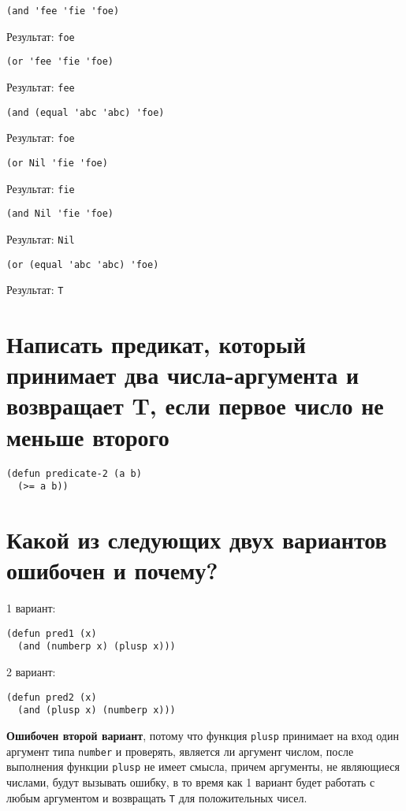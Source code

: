 \begin{lstlisting}
(and 'fee 'fie 'foe)
\end{lstlisting}
Результат: \texttt{foe}

\begin{lstlisting}
(or 'fee 'fie 'foe)
\end{lstlisting}
Результат: \texttt{fee}

\begin{lstlisting}
(and (equal 'abc 'abc) 'foe)
\end{lstlisting}
Результат: \texttt{foe}

\begin{lstlisting}
(or Nil 'fie 'foe)
\end{lstlisting}
Результат: \texttt{fie}

\begin{lstlisting}
(and Nil 'fie 'foe)
\end{lstlisting}
Результат: \texttt{Nil}

\begin{lstlisting}
(or (equal 'abc 'abc) 'foe)
\end{lstlisting}
Результат: \texttt{T}

\section{Написать предикат, который принимает два числа-аргумента и возвращает T, если первое число не меньше второго}

\begin{lstlisting}
(defun predicate-2 (a b)
  (>= a b))
\end{lstlisting}

\section{Какой из следующих двух вариантов ошибочен и почему?}

1 вариант:
\begin{lstlisting}
(defun pred1 (x)
  (and (numberp x) (plusp x)))
\end{lstlisting}

2 вариант:
\begin{lstlisting}
(defun pred2 (x)
  (and (plusp x) (numberp x)))
\end{lstlisting}

\textbf{Ошибочен второй вариант}, потому что функция \texttt{plusp} принимает на вход один аргумент типа \texttt{number} и проверять, является ли аргумент числом, после выполнения функции \texttt{plusp} не имеет смысла, причем аргументы, не являющиеся числами, будут вызывать ошибку, в то время как 1 вариант будет работать с любым аргументом и возвращать \texttt{T} для положительных чисел.

